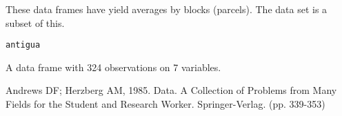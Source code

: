 \begin{Description}\relax
These data frames have yield averages by blocks (parcels). The
 data set is a subset of this.
\end{Description}
\begin{Usage}
\begin{verbatim}antigua\end{verbatim}
\end{Usage}
\begin{Format}\relax
A data frame with 324 observations on 7 variables.
\end{Format}
\begin{Source}\relax
Andrews DF; Herzberg AM, 1985. Data. A Collection of Problems from
Many Fields for the Student and Research Worker. Springer-Verlag.
(pp. 339-353)
\end{Source}

